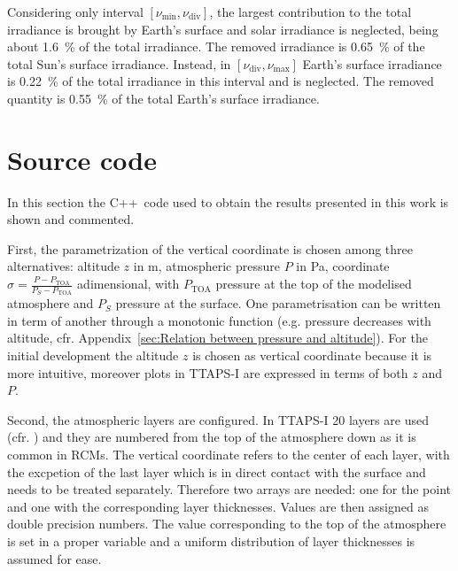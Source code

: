 \documentclass[a4paper,10pt,twocolumn,\classoptions]{article}
\newcommand{\cpp}{C++}
\newcommand{\PTOA}{P_\text{TOA}}
\begin{document}
Considering only interval $[\nu_\text{min}, \nu_\text{div}]$, the largest contribution to the total irradiance is brought by Earth's surface and solar irradiance is neglected, being about \qty{1.6}{\percent} of the total irradiance. The removed irradiance is \qty{0.65}{\percent} of the total Sun's surface irradiance. %
Instead, in $[\nu_\text{div}, \nu_\text{max}]$ Earth's surface irradiance is \qty{0.22}{\percent} of the total irradiance in this interval and is neglected. The removed quantity is \qty{0.55}{\percent} of the total Earth's surface irradiance. %




\newpage
\appendix

\section{Source code}
In this section the \cpp\ code used to obtain the results presented in this work is shown and commented.

First, the parametrization of the vertical coordinate is chosen among three alternatives: altitude $z$ in \unit{\metre}, atmospheric pressure $P$ in \unit{\pascal}, coordinate $\sigma = \frac{P - \PTOA}{P_S - \PTOA}$ adimensional, with $\PTOA$ pressure at the top of the modelised atmosphere and $P_S$ pressure at the surface. One parametrisation can be written in term of another through a monotonic function (e.g. pressure decreases with altitude, cfr. Appendix~\ref{sec:Relation between pressure and altitude}). For the initial development the altitude $z$ is chosen as vertical coordinate because it is more intuitive, moreover plots in TTAPS-I are expressed in terms of both $z$ and $P$.

Second, the atmospheric layers are configured. In TTAPS-I 20 layers are used (cfr. \cite[396]{NuclearWinterPhysics}) and they are numbered from the top of the atmosphere down as it is common in RCMs. The vertical coordinate refers to the center of each layer, with the excpetion of the last layer which is in direct contact with the surface and needs to be treated separately. %
Therefore two arrays are needed: one for the point and one with the corresponding layer thicknesses. Values are then assigned as double precision numbers. The value corresponding to the top of the atmosphere is set in a proper variable and a uniform distribution of layer thicknesses is assumed for ease.
\end{document}
